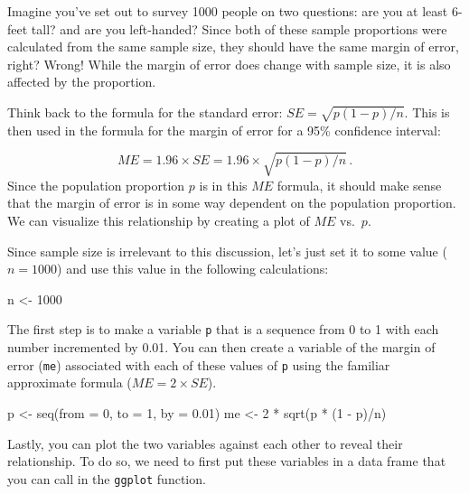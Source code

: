 \documentclass[
]{article}
\newenvironment{Shaded}{\begin{snugshade}}{\end{snugshade}}
\newcommand{\AttributeTok}[1]{\textcolor[rgb]{0.77,0.63,0.00}{#1}}
\newcommand{\DecValTok}[1]{\textcolor[rgb]{0.00,0.00,0.81}{#1}}
\newcommand{\FloatTok}[1]{\textcolor[rgb]{0.00,0.00,0.81}{#1}}
\newcommand{\FunctionTok}[1]{\textcolor[rgb]{0.00,0.00,0.00}{#1}}
\newcommand{\NormalTok}[1]{#1}
\newcommand{\OtherTok}[1]{\textcolor[rgb]{0.56,0.35,0.01}{#1}}
\newcommand{\SpecialCharTok}[1]{\textcolor[rgb]{0.00,0.00,0.00}{#1}}
\begin{document}
Imagine you've set out to survey 1000 people on two questions: are you
at least 6-feet tall? and are you left-handed? Since both of these
sample proportions were calculated from the same sample size, they
should have the same margin of error, right? Wrong! While the margin of
error does change with sample size, it is also affected by the
proportion.

Think back to the formula for the standard error:
\(SE = \sqrt{p(1-p)/n}\). This is then used in the formula for the
margin of error for a 95\% confidence interval:

\[
ME = 1.96\times SE = 1.96\times\sqrt{p(1-p)/n} \,.
\] Since the population proportion \(p\) is in this \(ME\) formula, it
should make sense that the margin of error is in some way dependent on
the population proportion. We can visualize this relationship by
creating a plot of \(ME\) vs.~\(p\).

Since sample size is irrelevant to this discussion, let's just set it to
some value (\(n = 1000\)) and use this value in the following
calculations:

\begin{Shaded}
\begin{Highlighting}[]
\NormalTok{n }\OtherTok{\textless{}{-}} \DecValTok{1000}
\end{Highlighting}
\end{Shaded}

The first step is to make a variable \texttt{p} that is a sequence from
0 to 1 with each number incremented by 0.01. You can then create a
variable of the margin of error (\texttt{me}) associated with each of
these values of \texttt{p} using the familiar approximate formula
(\(ME = 2 \times SE\)).

\begin{Shaded}
\begin{Highlighting}[]
\NormalTok{p }\OtherTok{\textless{}{-}} \FunctionTok{seq}\NormalTok{(}\AttributeTok{from =} \DecValTok{0}\NormalTok{, }\AttributeTok{to =} \DecValTok{1}\NormalTok{, }\AttributeTok{by =} \FloatTok{0.01}\NormalTok{)}
\NormalTok{me }\OtherTok{\textless{}{-}} \DecValTok{2} \SpecialCharTok{*} \FunctionTok{sqrt}\NormalTok{(p }\SpecialCharTok{*}\NormalTok{ (}\DecValTok{1} \SpecialCharTok{{-}}\NormalTok{ p)}\SpecialCharTok{/}\NormalTok{n)}
\end{Highlighting}
\end{Shaded}

Lastly, you can plot the two variables against each other to reveal
their relationship. To do so, we need to first put these variables in a
data frame that you can call in the \texttt{ggplot} function.
\end{document}
